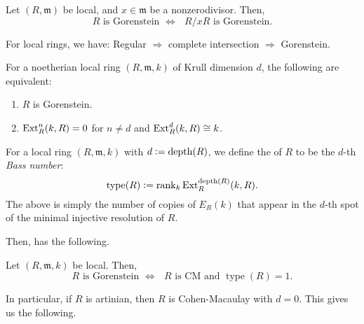 \documentclass[12pt]{article}
\DeclareMathOperator{\ty}{type}
\begin{document}
\begin{lem} 
	Let $(R, \mathfrak{m})$ be local, and $x \in \mathfrak{m}$ be a nonzerodivisor. Then, 
	\begin{equation*} 
		\text{$R$ is Gorenstein $\Leftrightarrow$ $R/xR$ is Gorenstein}.
	\end{equation*} 
\end{lem}
\begin{cor}
	For local rings, we have: Regular $\Rightarrow$ complete intersection $\Rightarrow$ Gorenstein. \newline
\end{cor}

\begin{thm}
	For a noetherian local ring $(R, \mathfrak{m}, k)$ of Krull dimension $d$, the following are equivalent:
	\begin{enumerate}
		\item $R$ is Gorenstein.
		\item $\operatorname{Ext}_{R}^{n}(k, R) = 0$ for $n \neq d$ and $\operatorname{Ext}_{R}^{d}(k, R) \cong k$.
	\end{enumerate}
\end{thm}

For a local ring $(R, \mathfrak{m}, k)$ with $d \vcentcolon= \operatorname{depth}(R)$, we define the  of $R$ to be the $d$-th \emph{Bass number}:
\begin{equation*} 
	\ty(R) \vcentcolon= \rank_{k} \Ext_{R}^{\depth(R)}(k, R).
\end{equation*}
The above is simply the number of copies of $E_{R}(k)$ that appear in the $d$-th spot of the minimal injective resolution of $R$.

Then, has the following.
\begin{thm}
	Let $(R, \mathfrak{m}, k)$ be local. Then,
	\begin{equation*} 
		\text{$R$ is Gorenstein $\Leftrightarrow$ $R$ is CM and $\ty(R) = 1$}.
	\end{equation*}
\end{thm}

In particular, if $R$ is artinian, then $R$ is Cohen-Macaulay with $d = 0$. This gives us the following.
\end{document}
